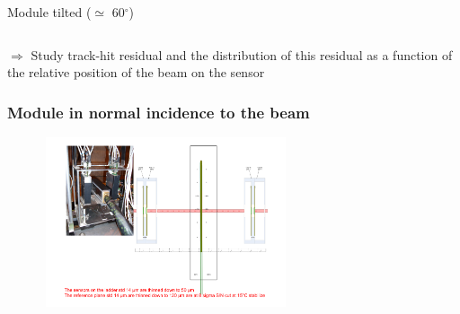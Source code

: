 \documentclass{beamer}
\newcommand{\grille}{
    \begin{tikzpicture}[overlay,remember picture]
        \begin{scope}[shift={(current page.south west)}]
            \draw[gray!50] (0,0) grid[step=2mm] (current page.north east);
            \draw[red!50] (0,0) grid[step=1cm] (current page.north east);
            \draw (0.2,1) node {1};
            \draw (0.2,2) node {2};
            \draw (0.2,3) node {3};
            \draw (0.2,4) node {4};
            \draw (0.2,5) node {5};
            \draw (0.2,6) node {6};
            \draw (0.2,7) node {7};
            \draw (0.2,8) node {8};
            \draw (0.2,9) node {9};
            \draw (1,0.5) node {1};
            \draw (2,0.5) node {2};
            \draw (3,0.5) node {3};
            \draw (4,0.5) node {4};
            \draw (5,0.5) node {5};
            \draw (6,0.5) node {6};
            \draw (7,0.5) node {7};
            \draw (8,0.5) node {8};
            \draw (9,0.5) node {9};
            \draw (10,0.5) node {10};
            \draw (11,0.5) node {11};
            \draw (12,0.5) node {12};
        \end{scope}
    \end{tikzpicture}
}
\newcommand{\degres}{\ensuremath{^\circ}}
\begin{document}
\begin{frame}
\begin{columns}[t]
\begin{column}{4cm}
\begin{center}
          \footnotesize{Module tilted ($\simeq$ 60\degres)}
        \end{center}
      \end{column}
    \end{columns}

    \vspace{0.1cm}
    \footnotesize{$\Rightarrow$ Study track-hit residual and the distribution of this residual as a function of the relative position of the beam on the sensor

    \vspace{0.1cm}
    }
\end{frame}

\begin{frame}
  \frametitle{Module in normal incidence to the beam}

  \begin{center}
    \includegraphics[width = 0.7\textwidth, height = 5cm]{Pictures/tb_cern_11_sketch_normal.pdf}
  \end{center}
\end{frame}
\end{document}

